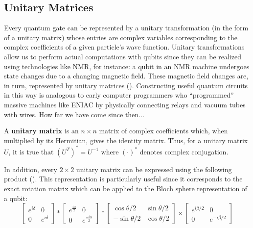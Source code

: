 \subsection{Unitary Matrices}
Every quantum gate can be represented by a unitary transformation (in the form of a unitary matrix) whose entries are complex variables corresponding to the complex coefficients of a given particle's wave function. Unitary transformations allow us to perform actual computations with qubits since they can be realized using technologies like NMR, for instance: a qubit in an NMR machine undergoes state changes due to a changing magnetic field. These magnetic field changes are, in turn, represented by unitary matrices (\cite{Lukac2003}). Constructing useful quantum circuits in this way is analogous to early computer programmers who ``programmed'' massive machines like ENIAC by physically connecting relays and vacuum tubes with wires. How far we have come since then...

\begin{mydef}
 A {\bf unitary matrix} is an $n \times n$ matrix of complex coefficients which, when multiplied by its Hermitian, gives the identity matrix. Thus, for a unitary matrix $U$, it is true that $(U^{T})^{*} = U^{-1}$ where $(\cdot)^{*}$ denotes complex conjugation.
\end{mydef}

In addition, every $2 \times 2$ unitary matrix can be expressed using the following product (\cite{Barenco1995}). This representation is particularly useful since it corresponds to the exact rotation matrix which can be applied to the Bloch sphere representation of a qubit: \\
\[ \left[
 \begin{matrix}
  e^{i\delta} & 0 \\
  0 & e^{i\delta}
 \end{matrix}
  \right] *
  \left[
  \begin{matrix}
   e^{\frac{i\alpha}{2}} & 0 \\
   0 & e^{\frac{-i\alpha}{2}}
  \end{matrix}
  \right] *
  \left[
  \begin{matrix}
   \cos{\theta/2} & \sin{\theta/2} \\
   -\sin{\theta/2}& \cos{\theta/2}
  \end{matrix}
  \right] \times
  \left[
  \begin{matrix}
  e^{i\beta/2} & 0 \\
  0 & e^{-i\beta/2}
  \end{matrix}
  \right]
\]

